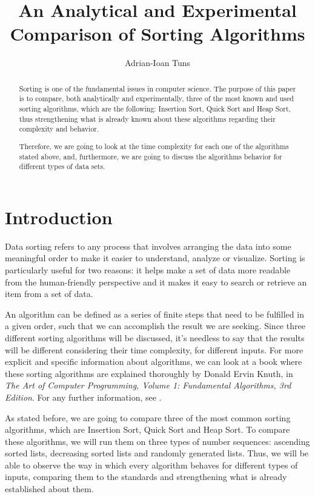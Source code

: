 \documentclass[]{article}
\title{An Analytical and Experimental Comparison of Sorting Algorithms}
\author{Adrian-Ioan Tuns}
\affil{Departament of Computer Science

Faculty of Mathematics and Informatics

West University of Timișoara

\iffalse
Address: Bulevardul Vasile Pârvan 4, Timișoara 300223
\fi

Email: adrian.tuns99@e-uvt.ro}
\begin{document}
	\maketitle
	\begin{abstract}
Sorting is one of the fundamental issues in computer science. The purpose of this paper is to compare, both analytically and experimentally, three of the most known and used sorting algorithms, which are the following: Insertion Sort, Quick Sort and Heap Sort, thus strengthening what is already known about these algorithms regarding their complexity and behavior.

Therefore, we are going to look at the time complexity for each one of the algorithms stated above, and, furthermore, we are going to discuss the algorithms behavior for different types of data sets.
	
	\end{abstract}
	\pagebreak
	
\tableofcontents
\pagebreak

	\section{Introduction}	
Data sorting refers to any process that involves arranging the data into some meaningful order to make it easier to understand, analyze or visualize.  Sorting is particularly useful for two reasons: it helps make a set of data more readable from the human-friendly perspective and it makes it easy to search or retrieve an item from a set of data.
	
An algorithm can be defined as a series of finite steps that need to be fulfilled in a given order, such that we can accomplish the result we are seeking. Since three different sorting algorithms will be discussed, it's needless to say that the results will be different considering their time complexity, for different inputs. For more explicit and specific information about algorithms, we can look at a book where these sorting algorithms are explained thoroughly by Donald Ervin Knuth, in \textit{The Art of Computer Programming, Volume 1: Fundamental Algorithms, 3rd Edition}. For any further information, see \cite{Knuth:1997:Vol1}.

As stated before, we are going to compare three of the most common sorting algorithms, which are Insertion Sort, Quick Sort and Heap Sort. To compare these algorithms, we will run them on three types of number sequences: ascending sorted lists, decreasing sorted lists and randomly generated lists. Thus, we will be able to observe the way in which every algorithm behaves for different types of inputs, comparing them to the standards and strengthening what is already established about them.
\end{document}
